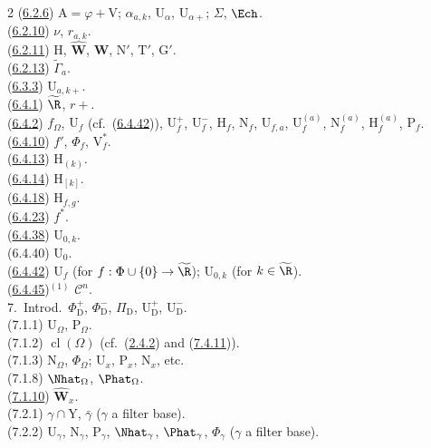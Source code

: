 \documentclass[12pt,a4paper,oneside,english]{smfart}
\newcommand{\btref}[1]{\hyperlink{bt:#1}{#1}}
\theoremstyle{definition}
\theoremstyle{bt}
\begin{document}
\begin{multicols}{2}
(\btref{6.2.6}) $\mathrm{A}=\varphi+\mathrm{V}$; $\alpha_{a,k}$, $\mathrm{U}_\alpha$, $\mathrm{U}_{\alpha+}$; $\Sigma$, $\Ech$.\\
(\btref{6.2.10}) $\nu$, $r_{a,k}$.\\
(\btref{6.2.11}) $\mathrm{H}$, $\widehat{\mathbf{W}}$, $\mathbf{W}$, $\mathrm{N}'$, $\mathrm{T}'$, $\mathrm{G}'$.\\
(\btref{6.2.13}) $\widetilde{\Gamma}_a$.\\
(\btref{6.3.3}) $\mathrm{U}_{a,k+}$.\\
(\btref{6.4.1}) $\widetilde{\R}$, $r+$.\\
(\btref{6.4.2}) $f_{\Omega}$, $\mathrm{U}_f$ (cf.\ (\btref{6.4.42})), $\mathrm{U}^{+}_f$, $\mathrm{U}^{-}_f$, $\mathrm{H}_f$, $\mathrm{N}_f$, $\mathrm{U}_{f,a}$, $\mathrm{U}^{(a)}_f$, $\mathrm{N}^{(a)}_f$, $\mathrm{H}^{(a)}_f$, $\mathrm{P}_f$.\\
(\btref{6.4.10}) $f'$, $\Phi_f$, $\mathrm{V}^{*}_f$.\\
(\btref{6.4.13}) $\mathrm{H}_{(k)}$.\\
(\btref{6.4.14}) $\mathrm{H}_{[k]}$.\\
(\btref{6.4.18}) $\mathrm{H}_{f,g}$.\\
(\btref{6.4.23}) $f^{*}$.\\
(\btref{6.4.38}) $\mathrm{U}_{0,k}$.\\
(6.4.40) $\mathrm{U}_0$.\\
(\btref{6.4.42}) $\mathrm{U}_f$ (for $f:\Phi\cup\{0\}\to\widetilde{\R}$); $\mathrm{U}_{0,k}$ (for $k\in\widetilde{\R}$).\\
(\btref{6.4.45})$^{(1)}$ $\mathscr{C}^{n}$.\\
7.\ Introd.\ $\Phi^{+}_{\mathrm{D}}$, $\Phi^{-}_{\mathrm{D}}$, $\Pi_{\mathrm{D}}$, $\mathrm{U}^{+}_{\mathrm{D}}$, $\mathrm{U}^{-}_{\mathrm{D}}$.\\
(7.1.1) $\mathrm{U}_{\Omega}$, $\mathrm{P}_{\Omega}$.\\
(7.1.2) $\operatorname{cl}(\Omega)$ (cf.\ (\btref{2.4.2}) and (\btref{7.4.11})).\\
(7.1.3) $\mathrm{N}_{\Omega}$, $\Phi_{\Omega}$; $\mathrm{U}_x$, $\mathrm{P}_x$, $\mathrm{N}_x$, etc.\\
(7.1.8) $\Nhat_{\Omega}$, $\Phat_{\Omega}$.\\
(\btref{7.1.10}) $\widehat{\mathbf{W}}_x$.\\
(7.2.1) $\gamma\cap \mathrm{Y}$, $\bar\gamma$ ($\gamma$ a filter base).\\
(7.2.2) $\mathrm{U}_\gamma$, $\mathrm{N}_\gamma$, $\mathrm{P}_\gamma$, $\Nhat_\gamma$, $\Phat_\gamma$, $\Phi_\gamma$ ($\gamma$ a filter base).\\

\end{multicols}
\end{document}
